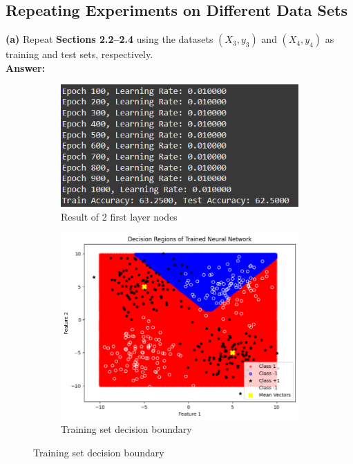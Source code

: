 \documentclass[a4paper,12pt]{article}
\begin{document}
\subsection{Repeating Experiments on Different Data Sets}
\textbf{(a)} Repeat \textbf{Sections 2.2–2.4} using the datasets $(X_3, y_3)$ and $(X_4, y_4)$ as training and test sets, respectively.\\
\textbf{Answer:}
\begin{figure}[H]
    \centering
    \captionsetup[subfigure]{list=true} %

    \begin{subfigure}{0.5\textwidth}
        \centering
        \includegraphics[width=\textwidth]{3.2_2_r.png}
        \caption{Result of 2 first layer nodes}
    \end{subfigure}
    \begin{subfigure}{0.45\textwidth}
        \centering
        \includegraphics[width=\textwidth]{3.2_2_Train.png}
        \caption{Training set decision boundary}
    \end{subfigure}


\end{figure}
\end{document}
